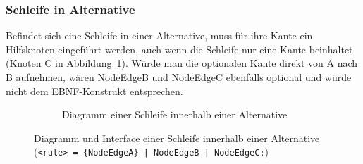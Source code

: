 \documentclass[../InterneDSLs.tex]{subfiles}
\begin{document}
\subsubsection{Schleife in Alternative}
Befindet sich eine Schleife in einer Alternative, muss für ihre Kante ein Hilfsknoten eingeführt werden, auch wenn die Schleife nur eine Kante beinhaltet (Knoten C in Abbildung~\ref{FIG:DiagramLoopInAlternative}). Würde man die optionalen Kante direkt von A nach B aufnehmen, wären NodeEdgeB und NodeEdgeC ebenfalls optional und würde nicht dem EBNF-Konstrukt entsprechen.
\begin{figure}[ht]
\centering
  \begin{subfigure}[c]{0.49\textwidth}
    \caption{Diagramm einer Schleife innerhalb einer Alternative}
    \label{FIG:DiagramLoopInAlternative}
  \end{subfigure}
  \begin{subfigure}[c]{0.49\textwidth}
    
  \end{subfigure}
  \caption{Diagramm und Interface einer Schleife innerhalb einer Alternative (\texttt{<rule> = \{NodeEdgeA\} | NodeEdgeB | NodeEdgeC;})}
  \label{FIG:LoopInAlternative}
\end{figure}
\end{document}
